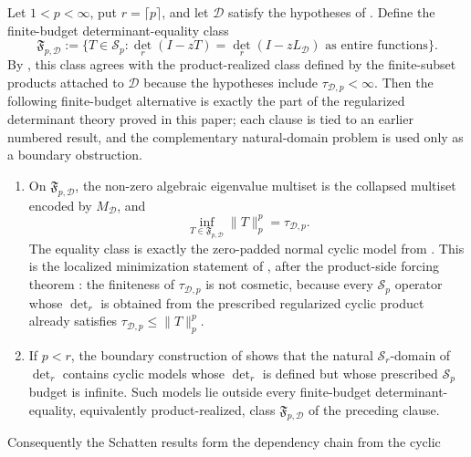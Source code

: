 \begin{proposition}
  \label{prop:prescribed-schatten-chain-scope}
  Let \(1<p<\infty\), put \(r=\lceil p\rceil\), and let
  \(\mathcal D\) satisfy the hypotheses of
  .  Define the finite-budget
  determinant-equality class
  \[
    \mathfrak F_{p,\mathcal D}
    :=\{T\in\mathcal S_p:
      \det_r(I-zT)=\det_r(I-zL_{\mathcal D})
      \text{ as entire functions}\}.
  \]
  By , this class agrees with
  the product-realized class defined by the finite-subset products attached to
  \(\mathcal D\) because the hypotheses include
  \(\tau_{\mathcal D,p}<\infty\).  Then the following finite-budget alternative
  is exactly the part of the
  regularized determinant theory proved in this paper; each clause is tied to
  an earlier numbered result, and the complementary natural-domain problem is
  used only as a boundary obstruction.
  \begin{enumerate}[label=\textup{(\roman*)}]
    \item On \(\mathfrak F_{p,\mathcal D}\), the non-zero algebraic
    eigenvalue multiset is the collapsed multiset encoded by
    \(M_{\mathcal D}\), and
    \[
      \inf_{T\in\mathfrak F_{p,\mathcal D}}\|T\|_p^p
      =
      \tau_{\mathcal D,p}.
    \]
    The equality class is exactly the zero-padded normal cyclic model from
    .
    This is the localized minimization statement of
    , after the product-side
    forcing theorem
    : the finiteness of
    \(\tau_{\mathcal D,p}\) is not cosmetic, because every \(\mathcal S_p\)
    operator whose \(\det_r\) is obtained from the prescribed regularized cyclic
    product already satisfies
    \(\tau_{\mathcal D,p}\le\|T\|_p^p\).
    \item If \(p<r\), the boundary construction of
    shows that the natural \(\mathcal S_r\)-domain of \(\det_r\) contains
    cyclic models whose \(\det_r\) is defined but whose prescribed
    \(\mathcal S_p\) budget is infinite.  Such models lie outside every
    finite-budget determinant-equality, equivalently product-realized, class
    \(\mathfrak F_{p,\mathcal D}\) of the preceding clause.
  \end{enumerate}
  Consequently the Schatten results form the dependency chain from the cyclic

\end{proposition}
